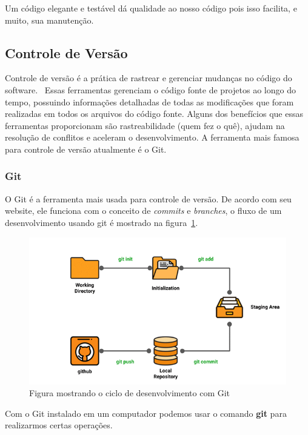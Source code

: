 \documentclass[12pt]{article}
\begin{document}
Um código elegante e testável dá qualidade ao nosso código pois isso facilita, e muito, sua manutenção.

\subsection{Controle de Versão}

Controle de versão é a prática de rastrear e gerenciar mudanças no código do software.~\cite{attlasianGit}
Essas ferramentas gerenciam o código fonte de projetos ao longo do tempo, possuindo informações detalhadas
de todas as modificações que foram realizadas em todos os arquivos do código fonte.
Alguns dos benefícios que essas ferramentas proporcionam são rastreabilidade (quem fez o quê),
ajudam na resolução de conflitos e aceleram o desenvolvimento. A ferramenta mais famosa para controle de
versão atualmente é o Git.

\subsubsection{Git}

O Git é a ferramenta mais usada para controle de versão. De acordo com seu website, ele
funciona com o conceito de \textit{commits} e \textit{branches}, o fluxo de um desenvolvimento usando git é
mostrado na figura~\ref{fig:git-lifecycle}.

\begin{figure}[H]
  \centering
  \includegraphics[width=.8\textwidth]{git-lifecycle.png}
  \caption{Figura mostrando o ciclo de desenvolvimento com Git}\label{fig:git-lifecycle}
\end{figure}

Com o Git instalado em um computador podemos usar o comando \textbf{git} para realizarmos certas operações.

\end{document}
